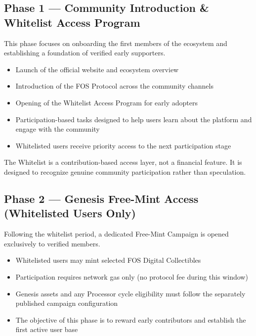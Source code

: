 \documentclass[
  10pt,
  letterpaper,
]{article}
\providecommand{\tightlist}{%
  \setlength{\itemsep}{0pt}\setlength{\parskip}{0pt}}
\begin{document}
\subsection{Phase 1 --- Community Introduction \& Whitelist Access
Program}\label{phase-1-community-introduction-whitelist-access-program}

This phase focuses on onboarding the first members of the ecosystem and
establishing a foundation of verified early supporters.

\begin{itemize}
\tightlist
\item
  Launch of the official website and ecosystem overview
\item
  Introduction of the FOS Protocol across the community channels
\item
  Opening of the Whitelist Access Program for early adopters
\item
  Participation-based tasks designed to help users learn about the
  platform and engage with the community
\item
  Whitelisted users receive priority access to the next participation
  stage
\end{itemize}

The Whitelist is a contribution-based access layer, not a financial
feature. It is designed to recognize genuine community participation
rather than speculation.

\subsection{Phase 2 --- Genesis Free-Mint Access (Whitelisted Users
Only)}\label{phase-2-genesis-free-mint-access-whitelisted-users-only}

Following the whitelist period, a dedicated Free-Mint Campaign is opened
exclusively to verified members.

\begin{itemize}
\tightlist
\item
  Whitelisted users may mint selected FOS Digital Collectibles
\item
  Participation requires network gas only (no protocol fee during this
  window)
\item
  Genesis assets and any Processor cycle eligibility must follow the
  separately published campaign configuration
\item
  The objective of this phase is to reward early contributors and
  establish the first active user base
\end{itemize}
\end{document}
